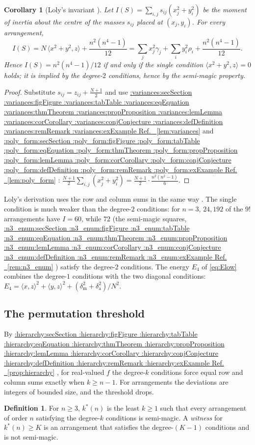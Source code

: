 \documentclass[11pt,a4paper]{article}
\makeatletter
\def\Cref@getprefix#1:#2\relax{#1}
\def\Cref@prefix@sec{sec}
\def\Cref@prefix@fig{fig}
\def\Cref@prefix@tab{tab}
\def\Cref@prefix@eq{eq}
\def\Cref@prefix@thm{thm}
\def\Cref@prefix@prop{prop}
\def\Cref@prefix@lem{lem}
\def\Cref@prefix@cor{cor}
\def\Cref@prefix@conj{conj}
\def\Cref@prefix@def{def}
\def\Cref@prefix@rem{rem}
\def\Cref@prefix@ex{ex}
\def\Cref@type@cap#1{%
  \edef\Cref@tmp{#1}%
  \ifx\Cref@tmp\Cref@prefix@sec Section%
  \else\ifx\Cref@tmp\Cref@prefix@fig Figure%
  \else\ifx\Cref@tmp\Cref@prefix@tab Table%
  \else\ifx\Cref@tmp\Cref@prefix@eq Equation%
  \else\ifx\Cref@tmp\Cref@prefix@thm Theorem%
  \else\ifx\Cref@tmp\Cref@prefix@prop Proposition%
  \else\ifx\Cref@tmp\Cref@prefix@lem Lemma%
  \else\ifx\Cref@tmp\Cref@prefix@cor Corollary%
  \else\ifx\Cref@tmp\Cref@prefix@conj Conjecture%
  \else\ifx\Cref@tmp\Cref@prefix@def Definition%
  \else\ifx\Cref@tmp\Cref@prefix@rem Remark%
  \else\ifx\Cref@tmp\Cref@prefix@ex Example%
  \else Ref.%
  \fi\fi\fi\fi\fi\fi\fi\fi\fi\fi\fi\fi
}
\DeclareRobustCommand{\Cref}[1]{%
  \begingroup
  \edef\Cref@label{#1}%
  \edef\Cref@prefix{\expandafter\Cref@getprefix\Cref@label:\relax}%
  \hyperref[#1]{\Cref@type@cap{\Cref@prefix}~\ref*{#1}}%
  \endgroup
}
\theoremstyle{plain}
\newtheorem{corollary}[theorem]{Corollary}
\theoremstyle{definition}
\newtheorem{definition}[theorem]{Definition}
\theoremstyle{remark}
\newcommand{\Efour}{E_4}
\makeatother
\begin{document}
\begin{corollary}[Loly's invariant {\cite{loly2004invariance}}]
\label{cor:loly}
Let $I(S)=\sum_{i,j}s_{ij}(x_{j}^{2}+y_{i}^{2})$ be the moment of inertia about the centre of the masses $s_{ij}$ placed at $(x_j,y_i)$.  For every arrangement,
\begin{equation}
I(S)=N\,\langle x^{2}+y^{2},z\rangle+\frac{n^{2}(n^{4}-1)}{12}
=\sum_j x_j^{2}\gamma_j+\sum_i y_i^{2}\rho_i+\frac{n^{2}(n^{4}-1)}{12}.
\label{eq:loly_identity}
\end{equation}
Hence $I(S)=n^{2}(n^{4}-1)/12$ if and only if the single condition $\langle x^2+y^2,z\rangle=0$ holds; it is implied by the degree-$2$ conditions, hence by the semi-magic property.
\end{corollary}

\begin{proof}
Substitute $s_{ij}=z_{ij}+\frac{N+1}2$ and use \Cref{lem:variances} and \Cref{lem:poly_form}: $\frac{N+1}2\sum_{i,j}(x_j^{2}+y_i^{2})=\frac{N+1}2\cdot\frac{n^{2}(n^{2}-1)}{6}$.
\end{proof}

Loly's derivation uses the row and column sums in the same way \cite{loly2004invariance}.
The single condition is much weaker than the degree-$2$ conditions: for $n=3$, $24{,}192$ of the $9!$ arrangements have $I=60$, while $72$ (the semi-magic squares, \Cref{rem:n3_enum}) satisfy the degree-$2$ conditions.
The energy $\Efour$ of \eqref{eq:Elow} combines the degree-$1$ conditions with the two diagonal conditions: $\Efour=\langle x,z\rangle^2+\langle y,z\rangle^2+(\delta_{\mathrm m}^2+\delta_{\mathrm a}^2)/N^2$.

\subsection{The permutation threshold}
\label{sec:kstar}

By \Cref{prop:hierarchy}, for real-valued $f$ the degree-$k$ conditions force equal row and column sums exactly when $k\ge n-1$.
For arrangements the deviations are integers of bounded size, and the threshold drops.

\begin{definition}
\label{def:kstar}
For $n\ge3$, $k^*(n)$ is the least $k\ge1$ such that every arrangement of order $n$ satisfying the degree-$k$ conditions is semi-magic.
A \emph{witness} for $k^*(n)\ge K$ is an arrangement that satisfies the degree-$(K-1)$ conditions and is not semi-magic.
\end{definition}
\end{document}
